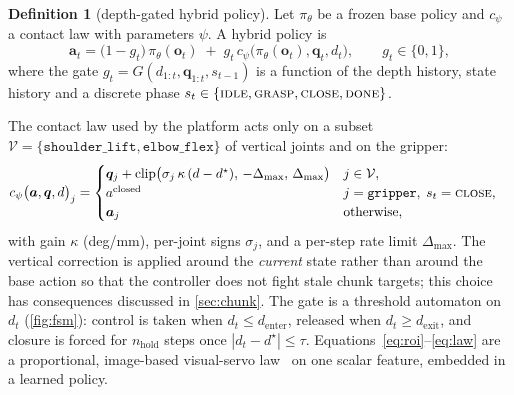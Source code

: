 \documentclass[11pt,a4paper]{article}
\theoremstyle{definition}
\newtheorem{definition}{Definition}
\newcommand{\obs}{\bm{o}}
\newcommand{\act}{\bm{a}}
\newcommand{\state}{\bm{q}}
\newcommand{\pol}{\pi_\theta}
\newcommand{\ctrl}{c_\psi}
\newcommand{\gate}{g}
\begin{document}
\begin{definition}[depth-gated hybrid policy]\label{def:hybrid}
Let $\pol$ be a frozen base policy and $\ctrl$ a contact law with parameters $\psi$. A hybrid policy is
\begin{equation}
\act_t = \big(1-\gate_t\big)\,\pol(\obs_t) \;+\; \gate_t\,\ctrl\big(\pol(\obs_t),\state_t,d_t\big),
\qquad \gate_t\in\{0,1\},
\label{eq:hybrid}
\end{equation}
where the gate $\gate_t = G(d_{1:t},\state_{1:t},s_{t-1})$ is a function of the depth history, state history and a discrete phase $s_t\in\{\textsc{idle},\textsc{grasp},\textsc{close},\textsc{done}\}$.
\end{definition}

The contact law used by the platform acts only on a subset $\mathcal{V}=\{\texttt{shoulder\_lift},\texttt{elbow\_flex}\}$ of vertical joints and on the gripper:
\begin{align}
\ctrl\big(\act,\state,d\big)_j &=
\begin{cases}
\state_j + \operatorname{clip}\!\big(\sigma_j\,\kappa\,(d - d^\star),\,-\Delta_{\max},\,\Delta_{\max}\big) & j\in\mathcal{V},\\
a^{\mathrm{closed}} & j=\texttt{gripper},\; s_t=\textsc{close},\\
\act_j & \text{otherwise},
\end{cases}
\label{eq:law}
\end{align}
with gain $\kappa$ (deg/mm), per-joint signs $\sigma_j$, and a per-step rate limit $\Delta_{\max}$. The vertical correction is applied around the \emph{current} state rather than around the base action so that the controller does not fight stale chunk targets; this choice has consequences discussed in \cref{sec:chunk}. The gate is a threshold automaton on $d_t$ (\cref{fig:fsm}): control is taken when $d_t\le d_{\mathrm{enter}}$, released when $d_t\ge d_{\mathrm{exit}}$, and closure is forced for $n_{\mathrm{hold}}$ steps once $|d_t-d^\star|\le\tau$. Equations~\eqref{eq:roi}--\eqref{eq:law} are a proportional, image-based visual-servo law~\citep{chaumette2006visualservo} on one scalar feature, embedded in a learned policy.
\end{document}
